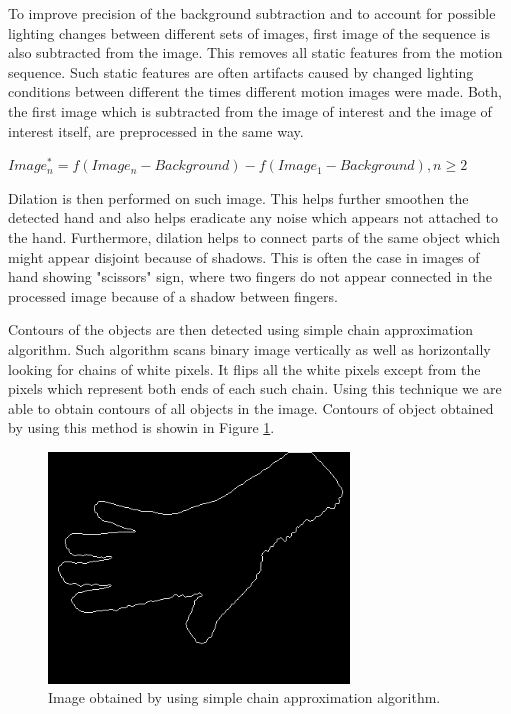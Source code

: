 To improve precision of the background subtraction and to account for possible lighting changes between different sets of images, first image of the sequence is also subtracted from the image. This removes all static features from the motion sequence. Such static features are often artifacts caused by changed lighting conditions between different the times different motion images were made. Both, the first image which is subtracted from the image of interest and the image of interest itself, are preprocessed in the same way.

\begin{math}
Image^*_n = f(Image_n - Background) - f(Image_1 - Background), n \geq 2
\end{math}

Dilation is then performed on such image. This helps further smoothen the detected hand and also helps eradicate any noise which appears not attached to the hand. Furthermore, dilation helps to connect parts of the same object which might appear disjoint because of shadows. This is often the case in images of hand showing "scissors" sign, where two fingers do not appear connected in the processed image because of a shadow between fingers.

Contours of the objects are then detected using simple chain approximation algorithm. Such algorithm scans binary image vertically as well as horizontally looking for chains of white pixels. It flips all the white pixels except from the pixels which represent both ends of each such chain. Using this technique we are able to obtain contours of all objects in the image. Contours of object obtained by using this method is showin in Figure \ref{fig:contours}.

\begin{figure}
\begin{center}
\includegraphics[width=80mm]{contours.png}
\caption{Image obtained by using simple chain approximation algorithm.}
\label{fig:contours}
\end{center}
\end{figure}

